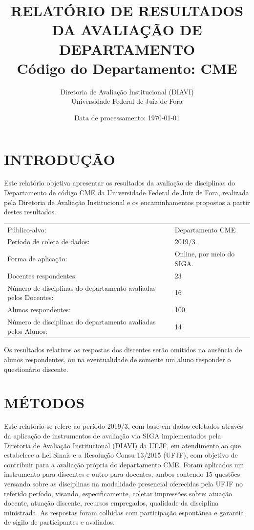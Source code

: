 \documentclass[a4paper,10pt]{article}
\date{Data de processamento: \today}
\begin{document}
\author{Diretoria de Avaliação Institucional (DIAVI) \\ Universidade Federal de Juiz de Fora}

\title{RELATÓRIO DE RESULTADOS DA AVALIAÇÃO DE DEPARTAMENTO\\ Código do Departamento: CME}
\maketitle
\section{INTRODUÇÃO}
Este relatório objetiva apresentar os resultados da avaliação de disciplinas do Departamento     de código CME da Universidade Federal de Juiz de Fora, realizada pela     Diretoria de Avaliação Institucional e os encaminhamentos propostos a     partir destes resultados.

\begin{center}
\begin{tabularx}{\linewidth}{X|l}

Público-alvo:& Departamento  CME\\

Período de coleta de dados:& 2019/3.\\

Forma de aplicação:& Online, por meio do SIGA.\\

Docentes respondentes:& 23\\

Número de disciplinas do departamento avaliadas pelos Docentes:& 16\\

Alunos   respondentes:& 100\\

Número de disciplinas do departamento  avaliadas pelos   Alunos:& 14\\
\end{tabularx}
\end{center}

Os resultados relativos as respostas dos discentes serão omitidos na ausência de alunos respondentes, ou na eventualidade de somente um aluno responder o questionário discente.
\section{MÉTODOS}
Este relatório se refere ao período 2019/3, com base em dados     coletados através da aplicação de instrumentos de avaliação via SIGA     implementados pela Diretoria de Avaliação Institucional (DIAVI) da UFJF, em atendimento     ao que estabelece a Lei Sinais e a Resolução Consu 13/2015 (UFJF),     com objetivo de contribuir para a avaliação própria do departamento CME.    Foram aplicados um instrumento para discentes e outro para docentes, ambos contendo     15 questões versando sobre as disciplinas na modalidade presencial oferecidas pela UFJF no     referido período, visando, especificamente, coletar impressões sobre: atuação docente, atuação discente,     recursos empregados, qualidade da disciplina ministrada.     As respostas foram colhidas      com participação espontânea e garantia de    sigilo de participantes e avaliados.
\end{document}
